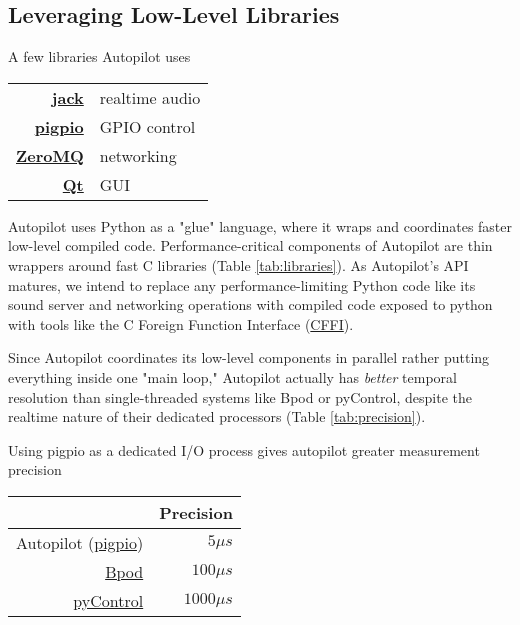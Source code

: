 \subsection{Leveraging Low-Level Libraries}
\label{sec:lowlevel}

\begin{margintable}[1.85cm]
\caption{A few libraries Autopilot uses}
\label{tab:libraries}
\noindent\begin{tabularx}{\linewidth}{rX}
\toprule
 \textbf{\href{http://jackaudio.org/}{jack}} & realtime audio \\
 \textbf{\href{http://abyz.me.uk/rpi/pigpio/index.html}{pigpio}} & GPIO control \\
 \textbf{\href{http://zeromq.org/}{ZeroMQ}} & networking \\
 \textbf{\href{https://www.qt.io/}{Qt}} & GUI \\
 \bottomrule
\end{tabularx}
\end{margintable}

Autopilot uses Python as a "glue" language, where it wraps and coordinates faster low-level compiled code\citep{vanrossumGlueItAll1998}.  
Performance-critical components of Autopilot are thin wrappers around fast C libraries (Table \ref{tab:libraries}). As Autopilot's API matures, we intend to replace any performance-limiting Python code like its sound server and networking operations with compiled code exposed to python with tools like the C Foreign Function Interface (\href{https://cffi.readthedocs.io/en/latest/index.html}{CFFI}).

Since Autopilot coordinates its low-level components in parallel rather putting everything inside one "main loop," Autopilot actually has \textit{better} temporal resolution than  single-threaded systems like Bpod or pyControl, despite the realtime nature of their dedicated processors (Table \ref{tab:precision}).

\begin{margintable}
\caption{Using pigpio as a dedicated I/O process gives autopilot greater measurement precision}
\label{tab:precision}
\noindent\begin{tabularx}{\linewidth}{rR}\toprule
& Precision \\
\midrule
Autopilot (\href{http://abyz.me.uk/rpi/pigpio/pigpiod.html}{pigpio}) & $5\mu s$ \\
\href{https://github.com/sanworks/Bpod_StateMachine_Firmware/blob/059d1e9195f5bb7d0d5cd7b33f56342eb5a3a55c/Dev/StateMachineFirmware/StateMachineFirmware.ino\#L196}{Bpod} & $100\mu s$ \\
\href{https://github.com/pyControl/code/blob/28cf5ea28ca2764aeea829eba148adfa5239254a/pyControl/framework.py\#L228}{pyControl} & $1000\mu s$ \\
\bottomrule
\end{tabularx}
\end{margintable}

